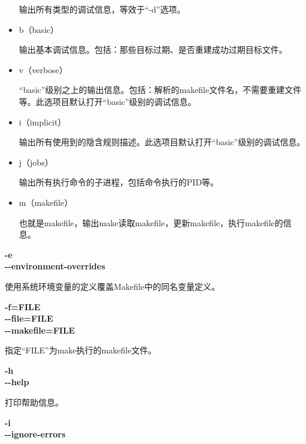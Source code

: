 \begin{dinglist}{47}
\begin{itemize}
输出所有类型的调试信息，等效于“-d”选项。

\item b（basic）

输出基本调试信息。包括：那些目标过期、是否重建成功过期目标文件。

\item v（verbose）

“basic”级别之上的输出信息。包括：解析的makefile文件名，不需要重建文件等。此选项目默认打开“basic”级别的调试信息。

\item i（implicit）

输出所有使用到的隐含规则描述。此选项目默认打开“basic”级别的调试信息。

\item j（jobs）

输出所有执行命令的子进程，包括命令执行的PID等。

\item m（makefile）

也就是makefile，输出make读取makefile，更新makefile，执行makefile的信息。

\end{itemize}

  \item \begin{minipage}[t]{\linewidth}
          \textbf{-e} \\
          \textbf{-{}-environment-overrides}
        \end{minipage}

使用系统环境变量的定义覆盖Makefile中的同名变量定义。

  \item \begin{minipage}[t]{\linewidth}
          \textbf{-f=FILE} \\
          \textbf{-{}-file=FILE} \\
          \textbf{-{}-makefile=FILE}
        \end{minipage}

指定“FILE”为make执行的makefile文件。

  \item \begin{minipage}[t]{\linewidth}
          \textbf{-h} \\
          \textbf{-{}-help}
        \end{minipage}

打印帮助信息。

  \item \begin{minipage}[t]{\linewidth}
          \textbf{-i} \\
          \textbf{-{}-ignore-errors}
        \end{minipage}


\end{dinglist}
